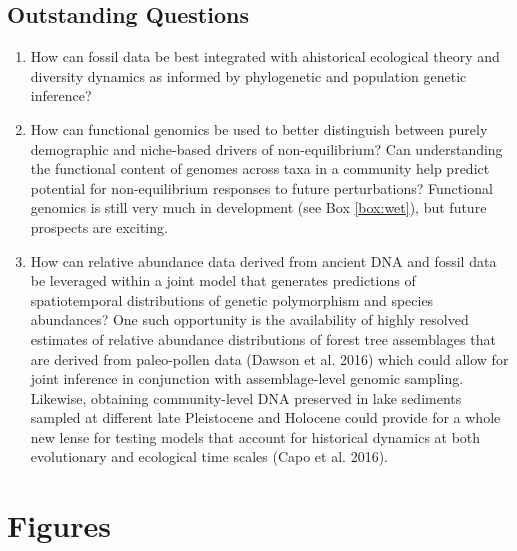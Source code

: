\documentclass[12pt]{article}
\newcounter{Box}
\begin{document}
\subsection*{Outstanding Questions}

\begin{enumerate}
\item How can fossil data be best integrated with ahistorical
  ecological theory and diversity dynamics as informed by phylogenetic
  and population genetic inference?
\item How can functional genomics be used to better distinguish
  between purely demographic and niche-based drivers of
  non-equilibrium? Can understanding the functional content of genomes
  across taxa in a community help predict potential for
  non-equilibrium responses to future perturbations? Functional
  genomics is still very much in development (see Box \ref{box:wet}),
  but future prospects are exciting.
\item How can relative abundance data derived from ancient DNA and fossil data be leveraged within a joint model that generates predictions of spatiotemporal distributions of genetic polymorphism and species abundances? One such opportunity is the availability of highly resolved estimates of relative abundance distributions of forest tree assemblages that are derived from paleo-pollen data (Dawson et al. 2016) which could allow for joint inference in conjunction with assemblage-level genomic sampling. Likewise, obtaining community-level DNA preserved in lake sediments sampled at different late Pleistocene and Holocene could provide for a whole new lense for testing models that account for historical dynamics at both evolutionary and ecological time scales (Capo et al. 2016). 
% 
% 
\end{enumerate}

\pagebreak

\section*{Figures}
\end{document}
